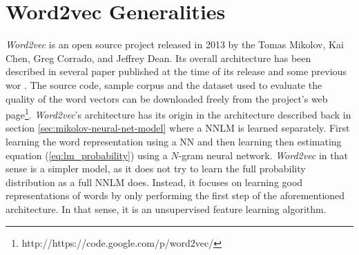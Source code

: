 






\section{Word2vec Generalities}
\label{sec:word2v-generalities}

\textit{Word2vec} is an open source project released in 2013 by the Tomas
Mikolov,  Kai Chen, Greg Corrado, and Jeffrey Dean.  
Its overall architecture has been described in several paper published at the
time of its release \cite{DBLP:journals/corr/abs-1301-3781,MikolovSCCD13,conf/naacl/MikolovYZ13}
and some previous wor \cite{mikolovphd2012}. The source code, sample corpus
and the dataset used to evaluate the quality of the word vectors  can be downloaded freely from the project's
 web page\footnote{http://https://code.google.com/p/word2vec/}.
\textit{Word2vec}'s architecture
has its origin  in the architecture described back in section 
\ref{sec:mikolov-neural-net-model} where a \ac{NNLM} is learned separately. 
First learning the word representation using a \ac{NN} and then learning then
estimating equation (\ref{eq:lm_probability}) using a $N$-gram neural
network.  \textit{Word2vec} in that sense is a simpler model, as it  does not try to
learn the full probability distribution as a full \ac{NNLM} does. Instead, it
 focuses on learning good representations of words by  only performing  the first step
of the aforementioned architecture.  In that sense, it is an
unsupervised feature learning algorithm.

